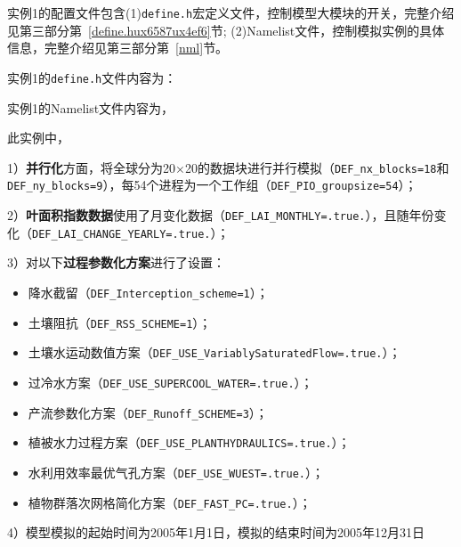 实例1的配置文件包含(1)\texttt{define.h}宏定义文件，控制模型大模块的开关，完整介绍见第三部分第~\ref{define.hux6587ux4ef6}节; (2)Namelist文件，控制模拟实例的具体信息，完整介绍见第三部分第~\ref{nml}节。

实例1的\texttt{define.h}文件内容为：


实例1的Namelist文件内容为，


此实例中，\par
1）\textbf{并行化}方面，将全球分为20\textdegree$\times$20\textdegree 的数据块进行并行模拟（\texttt{DEF\_nx\_blocks=18}和\texttt{DEF\_ny\_blocks=9}），每54个进程为一个工作组（\texttt{DEF\_PIO\_groupsize=54}）；\par
2）\textbf{叶面积指数数据}使用了月变化数据（\texttt{DEF\_LAI\_MONTHLY=.true.}），且随年份变化（\texttt{DEF\_LAI\_CHANGE\_YEARLY=.true.}）；\par

3）对以下\textbf{过程参数化方案}进行了设置：
\begin{itemize}[nosep,leftmargin=4em]
    \item 降水截留（\texttt{DEF\_Interception\_scheme=1}）；
    \item 土壤阻抗（\texttt{DEF\_RSS\_SCHEME=1}）；
    \item 土壤水运动数值方案（\texttt{DEF\_USE\_VariablySaturatedFlow=.true.}）；
    \item 过冷水方案（\texttt{DEF\_USE\_SUPERCOOL\_WATER=.true.}）；
    \item 产流参数化方案（\texttt{DEF\_Runoff\_SCHEME=3}）；
    \item 植被水力过程方案（\texttt{DEF\_USE\_PLANTHYDRAULICS=.true.}）；
    \item 水利用效率最优气孔方案（\texttt{DEF\_USE\_WUEST=.true.}）；
    \item 植物群落次网格简化方案（\texttt{DEF\_FAST\_PC=.true.}）；

\end{itemize}
\par
4）模型模拟的起始时间为2005年1月1日，模拟的结束时间为2005年12月31日\par

